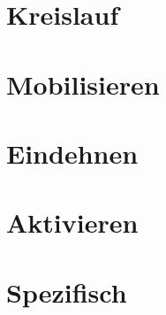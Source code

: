 \documentclass{article}
\begin{document}
    \section{Kreislauf}
    \section{Mobilisieren}
    \section{Eindehnen}
    \section{Aktivieren}
    \section{Spezifisch}
\end{document}

